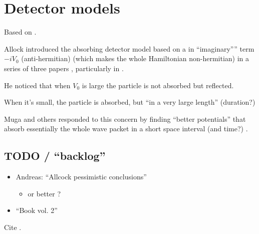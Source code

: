 \section{Detector models}

Based on \cite[Sec. 1.4.3]{TQM1}.

Allock introduced the absorbing detector model based on a in ``imaginary'''' term $-iV_0$
(anti-hermitian) (which makes the whole Hamiltonian non-hermitian) in a series of three papers
\parencite{Allcock-1, Allcock-2, Allcock-3},
particularly in \cite[Sec. 2-4]{Allcock-2}.

He noticed that when $V_0$ is large the particle is not absorbed but reflected.

When it's small, the particle is absorbed, but ``in a very large length'' (duration?)

Muga and others responded to this concern by finding ``better potentials'' that absorb essentially the
whole wave packet in a short space interval (and time?)
\parencite{Muga_TOAQM, Muga_CompositeAbsPot, ComplexAbsPot}.

\subsection{TODO / ``backlog''}

\begin{itemize}
  \item Andreas: ``Allcock pessimistic conclusions''
  \begin{itemize}
    \item \cite[3, 6]{Leavens_TOA} or better \cite{Leavens_backflow} ?
  \end{itemize}

  \item ``Book vol. 2'' \cite[Ch. 4]{TQM2}
\end{itemize}

Cite \cite{Muga_ArrTimeOpNormal, Damborenea, Sudarshan_Zeno, Echanobe, Savvidou-1, Savvidou-2}.
